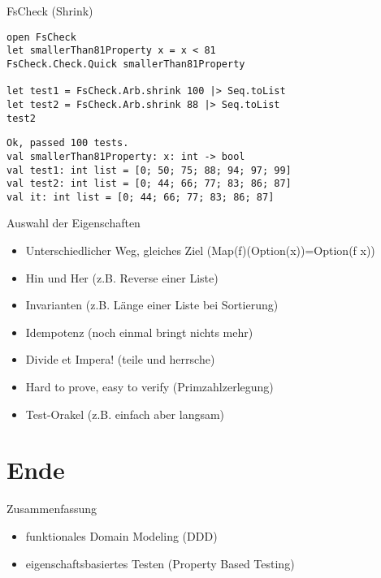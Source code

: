 \documentclass[t]{beamer}
\begin{document}
\begin{frame}[label={sec:orge1eb870},fragile]{FsCheck (Shrink)}
 \begin{verbatim}
open FsCheck
let smallerThan81Property x = x < 81
FsCheck.Check.Quick smallerThan81Property

let test1 = FsCheck.Arb.shrink 100 |> Seq.toList
let test2 = FsCheck.Arb.shrink 88 |> Seq.toList
test2
\end{verbatim}

\begin{verbatim}
Ok, passed 100 tests.
val smallerThan81Property: x: int -> bool
val test1: int list = [0; 50; 75; 88; 94; 97; 99]
val test2: int list = [0; 44; 66; 77; 83; 86; 87]
val it: int list = [0; 44; 66; 77; 83; 86; 87]
\end{verbatim}
\end{frame}

\begin{frame}[label={sec:org28fd5b5}]{Auswahl der Eigenschaften}
\begin{itemize}
\item Unterschiedlicher Weg, gleiches Ziel (Map(f)(Option(x))=Option(f x))
\item Hin und Her (z.B. Reverse einer Liste)
\item Invarianten (z.B. Länge einer Liste bei Sortierung)
\item Idempotenz (noch einmal bringt nichts mehr)
\item Divide et Impera! (teile und herrsche)
\item Hard to prove, easy to verify (Primzahlzerlegung)
\item Test-Orakel (z.B. einfach aber langsam)
\end{itemize}
\end{frame}

\section{Ende }
\label{sec:orgf7da6b3}
\begin{frame}[label={sec:org1913c15}]{Zusammenfassung}
\begin{itemize}
\item funktionales Domain Modeling (DDD)
\item eigenschaftsbasiertes Testen (Property Based Testing)
\end{itemize}
\end{frame}
\end{document}
